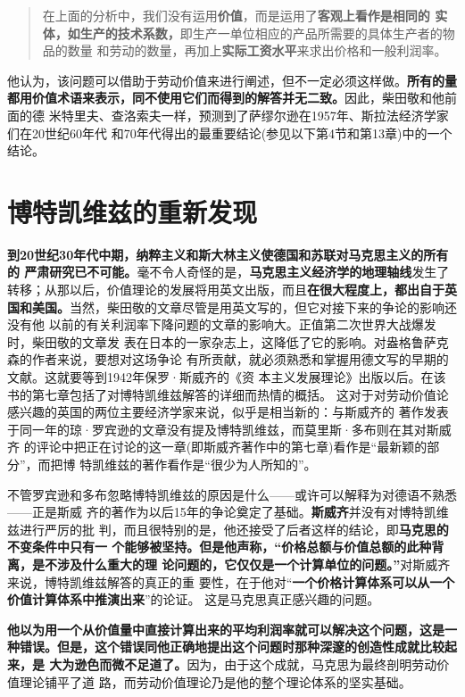 \begin{quotation}
  在上面的分析中，我们没有运用\textbf{价值}，而是运用了\textbf{客观上看作是相同的
    实体，如生产的技术系数，}即生产一单位相应的产品所需要的具体生产者的物品的数量
  和劳动的数量，再加上\textbf{实际工资水平}来求出价格和一般利润率。
\end{quotation}

他认为，该问题可以借助于劳动价值来进行阐述，但不一定必须这样做。\textbf{所有的量
  都用价值术语来表示，同不使用它们而得到的解答并无二致。}因此，柴田敬和他前面的德
米特里夫、查洛索夫一样，预测到了萨缪尔逊在1957年、斯拉法经济学家们在20世纪60年代
和70年代得出的最重要结论(参见以下第4节和第13章)中的一个结论。

\section{博特凯维兹的重新发现}

\textbf{到20世纪30年代中期，纳粹主义和斯大林主义使德国和苏联对马克思主义的所有的
  严肃研究已不可能。}毫不令人奇怪的是，\textbf{马克思主义经济学的地理轴线}发生了
转移；从那以后，价值理论的发展将用英文出版，而且\textbf{在很大程度上，都出自于英
  国和美国。}当然，柴田敬的文章尽管是用英文写的，但它对接下来的争论的影响还没有他
以前的有关利润率下降问题的文章的影响大。正值第二次世界大战爆发时，柴田敬的文章发
表在日本的一家杂志上，这降低了它的影响。对盎格鲁萨克森的作者来说，要想对这场争论
有所贡献，就必须熟悉和掌握用德文写的早期的文献。这就要等到1942年保罗·斯威齐的《资
本主义发展理论》出版以后。在该书的第七章包括了对博特凯维兹解答的详细而热情的概括。
这对于对劳动价值论感兴趣的英国的两位主要经济学家来说，似乎是相当新的：与斯威齐的
著作发表于同一年的琼·罗宾逊的文章没有提及博特凯维兹，而莫里斯·多布则在其对斯威齐
的评论中把正在讨论的这一章(即斯威齐著作中的第七章)看作是“最新颖的部分”，而把博
特凯维兹的著作看作是“很少为人所知的”。

不管罗宾逊和多布忽略博特凯维兹的原因是什么——或许可以解释为对德语不熟悉——正是斯威
齐的著作为以后15年的争论奠定了基础。\textbf{斯威齐}并没有对博特凯维兹进行严厉的批
判，而且很特别的是，他还接受了后者这样的结论，即\textbf{马克思的不变条件中只有一
  个能够被坚持。但是他声称，“价格总额与价值总额的此种背离，是不涉及什么重大的理
  论问题的，它仅仅是一个计算单位的问题。”}对斯威齐来说，博特凯维兹解答的真正的重
要性，在于他对“\textbf{一个价格计算体系可以从一个价值计算体系中推演出来}”的论证。
这是马克思真正感兴趣的问题。

\textbf{他以为用一个从价值量中直接计算出来的平均利润率就可以解决这个问题，这是一
  种错误。但是，这个错误同他正确地提出这个问题时那种深邃的创造性成就比较起来，是
  大为逊色而微不足道了。}因为，由于这个成就，马克思为最终剖明劳动价值理论铺平了道
路，而劳动价值理论乃是他的整个理论体系的坚实基础。

